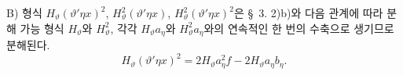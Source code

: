 
\noindent B) 형식 $H_\vartheta(\vartheta'\eta x)^2$, $H_\vartheta^2(\vartheta'\eta x)$, $H_\vartheta^2(\vartheta'\eta x)^2$은 \S\ 3. 2)b)와 다음 관계에 따라 분해 가능 형식 $H_\vartheta$와 $H_\vartheta^2$, 각각 $H_\vartheta a_\eta$와 $H_\vartheta^2a_\eta$와의 연속적인 한 번의 수축으로 생기므로 분해된다.
\[
H_\vartheta(\vartheta'\eta x)^2=2H_\vartheta a_\eta^2f-2H_\vartheta a_\eta b_\eta.
\]
